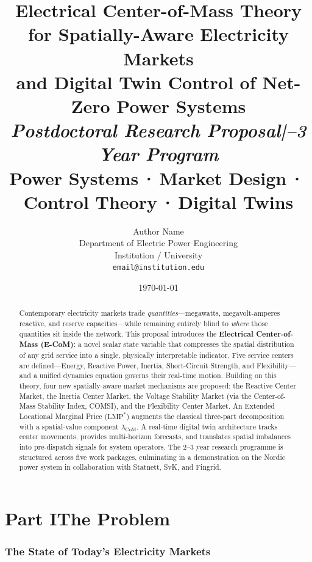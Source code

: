 \documentclass[12pt, a4paper]{article}
\title{%
  \textbf{Electrical Center-of-Mass Theory}\\[0.4em]
  \large for Spatially-Aware Electricity Markets\\
  and Digital Twin Control of Net-Zero Power Systems\\[1em]
  \normalsize\textit{Postdoctoral Research Proposal\quad|\quad2--3 Year Program}\\[0.2em]
  \small Power Systems\,·\,Market Design\,·\,Control Theory\,·\,Digital Twins
}
\author{%
  Author Name\\
  \small Department of Electric Power Engineering\\
  \small Institution / University\\
  \small \texttt{email@institution.edu}
}
\date{\today}
\begin{document}

\maketitle
\thispagestyle{empty}

\begin{abstract}
\noindent
Contemporary electricity markets trade \emph{quantities}---megawatts, megavolt-amperes
reactive, and reserve capacities---while remaining entirely blind to
\emph{where} those quantities sit inside the network.
This proposal introduces the \textbf{Electrical Center-of-Mass (E-CoM)}: a novel
scalar state variable that compresses the spatial distribution of any grid
service into a single, physically interpretable indicator.
Five service centers are defined---Energy, Reactive Power, Inertia, Short-Circuit
Strength, and Flexibility---and a unified dynamics equation governs their
real-time motion.
Building on this theory, four new spatially-aware market mechanisms are proposed:
the Reactive Center Market, the Inertia Center Market, the Voltage Stability
Market (via the Center-of-Mass Stability Index, COMSI), and the Flexibility Center
Market.
An Extended Locational Marginal Price ($\mathrm{LMP}^*$) augments the classical
three-part decomposition with a spatial-value component $\lambda_{\mathrm{CoM}}$.
A real-time digital twin architecture tracks center movements, provides
multi-horizon forecasts, and translates spatial imbalances into pre-dispatch
signals for system operators.
The 2--3 year research programme is structured across five work packages,
culminating in a demonstration on the Nordic power system in collaboration with
Statnett, SvK, and Fingrid.
\end{abstract}

\tableofcontents
\newpage

\part*{Part I\quad The Problem}

\section{The State of Today's Electricity Markets}
\label{sec:problem_markets}
\end{document}
